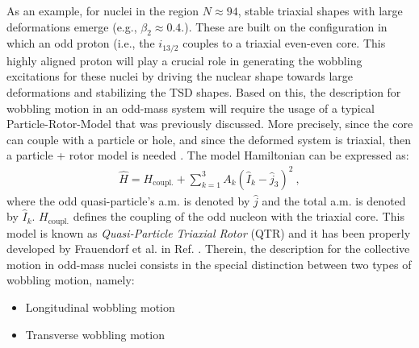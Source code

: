 As an example, for nuclei in the region $N\approx 94$, stable triaxial shapes with large deformations emerge (e.g., $\beta_2\approx0.4$.). These are built on the configuration in which an odd proton (i.e., the $i_{13/2}$ couples to a triaxial even-even core. This highly aligned proton will play a crucial role in generating the wobbling excitations for these nuclei by driving the nuclear shape towards large deformations and stabilizing the TSD shapes. Based on this, the description for wobbling motion in an odd-mass system will require the usage of a typical Particle-Rotor-Model that was previously discussed. More precisely, since the core can couple with a particle or hole, and since the deformed system is triaxial, then a particle + rotor model is needed \cite{frauendorf2014transverse}. The model Hamiltonian can be expressed as:
\begin{align}
    \hat{H}=H_\text{coupl.}+\sum_{k=1}^{3}A_k(\hat{I}_k-\hat{j}_3)^2\ ,
\end{align}
where the odd quasi-particle's a.m. is denoted by $\hat{j}$ and the total a.m. is denoted by $\hat{I}_k$. $H_\text{coupl.}$ defines the coupling of the odd nucleon with the triaxial core. This model is known as \emph{Quasi-Particle Triaxial Rotor} (QTR) and it has been properly developed by Frauendorf et al. in Ref. \cite{frauendorf2014transverse}. Therein, the description for the collective motion in odd-mass nuclei consists in the special distinction between two types of wobbling motion, namely:
\begin{itemize}
    \item Longitudinal wobbling motion
    \item Transverse wobbling motion
\end{itemize}